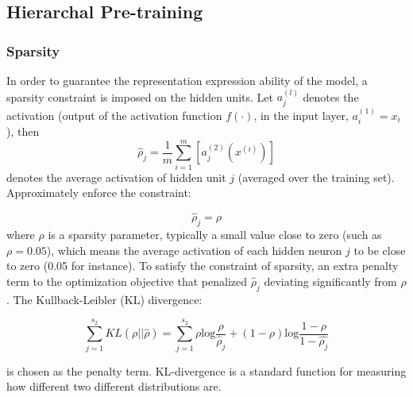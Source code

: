 \documentclass{bmcart}
\begin{document}
 
 


\subsection*{Hierarchal Pre-training}

\subsubsection*{Sparsity}
In order to guarantee the representation expression ability of the model, a sparsity constraint is imposed on the hidden units. Let $a_{j}^{(l)}$ denotes the activation (output of the activation function $f(\cdot)$, in the input layer, $a_i^{(1)}=x_i$), then
\begin{equation}
\hat{\rho}_j = \frac{1}{m} \sum_{i=1}^m [{a_j^{(2)}}{(x^{(i)})}]
\end{equation}
denotes the average activation of hidden unit $j$ (averaged over the training set). Approximately enforce the constraint:





\begin{equation}
\hat{\rho}_j = \rho
\end{equation}
where $\rho$ is a sparsity parameter, typically a small value close to zero (such as $\rho = 0.05$), which means the average activation of each hidden neuron $j$ to be close to zero (0.05 for instance). 
To satisfy the constraint of sparsity, an extra penalty term to the optimization objective that penalized $\hat{\rho}_j $ deviating significantly from $\rho$. The Kullback-Leibler (KL) divergence:

\begin{equation}
 \sum_{j=1}^{s_2}KL(\rho||\hat{\rho}) =  \sum_{j=1}^{s_2}\rho \text{log}{\frac{\rho}{\hat{\rho}_j}}+(1-\rho)\text{log}\frac{1-\rho}{1-\hat{{\rho}_j}}
\end{equation}

\noindent is chosen as the  penalty term. KL-divergence is a standard function for measuring how different two different distributions are. 
\end{document}
